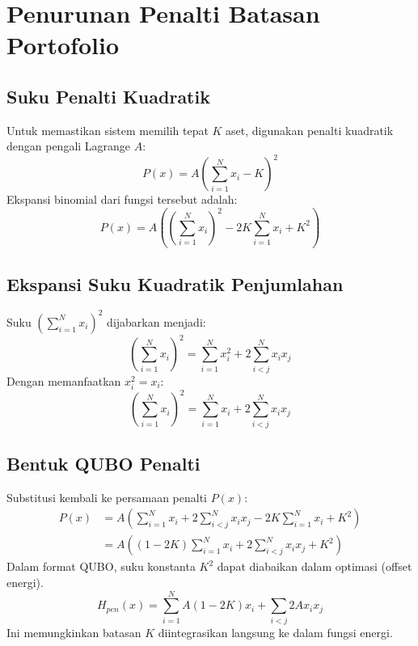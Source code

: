\section{Penurunan Penalti Batasan Portofolio}

\subsection{Suku Penalti Kuadratik}
Untuk memastikan sistem memilih tepat $K$ aset, digunakan penalti kuadratik dengan pengali Lagrange $A$:
\begin{equation}
P(x) = A \left(\sum_{i=1}^N x_i - K \right)^2
\label{eq:pen_qubo_derivation}
\end{equation}
Ekspansi binomial dari fungsi tersebut adalah:
\begin{equation}
P(x) = A \left( \left(\sum_{i=1}^N x_i\right)^2 - 2K\sum_{i=1}^N x_i + K^2 \right)
\end{equation}

\subsection{Ekspansi Suku Kuadratik Penjumlahan}
Suku $\left(\sum_{i=1}^N x_i\right)^2$ dijabarkan menjadi:
\begin{equation}
\left(\sum_{i=1}^N x_i\right)^2 = \sum_{i=1}^N x_i^2 + 2\sum_{i<j}^N x_i x_j
\end{equation}
Dengan memanfaatkan $x_i^2 = x_i$:
\begin{equation}
\left(\sum_{i=1}^N x_i\right)^2 = \sum_{i=1}^N x_i + 2\sum_{i<j}^N x_i x_j
\end{equation}

\subsection{Bentuk QUBO Penalti}
Substitusi kembali ke persamaan penalti $P(x)$:
\begin{equation}
\begin{aligned}
P(x) &= A \left( \sum_{i=1}^N x_i + 2\sum_{i<j}^N x_i x_j - 2K\sum_{i=1}^N x_i + K^2 \right) \\
&= A \left( (1-2K)\sum_{i=1}^N x_i + 2\sum_{i<j}^N x_i x_j + K^2 \right)
\end{aligned}
\end{equation}
Dalam format QUBO, suku konstanta $K^2$ dapat diabaikan dalam optimasi (offset energi).
\begin{equation}
H_{pen}(x) = \sum_{i=1}^N A(1-2K) x_i + \sum_{i < j} 2A x_i x_j
\end{equation}
Ini memungkinkan batasan $K$ diintegrasikan langsung ke dalam fungsi energi.
